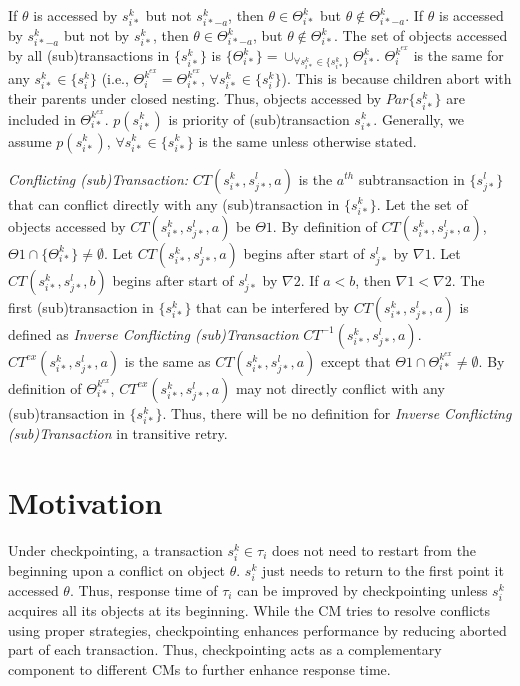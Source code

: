 \documentclass[preprint]{sigplanconf}
\begin{document}
If $\theta$ is accessed by $s_{i*}^{k}$ but not $s_{i*-a}^{k}$,
then $\theta\in\Theta_{i*}^{k}$ but $\theta\not\in\Theta_{i*-a}^{k}$.
If $\theta$ is accessed by $s_{i*-a}^{k}$ but not by $s_{i*}^{k}$,
then $\theta\in\Theta_{i*-a}^{k}$, but $\theta\not\in\Theta_{i*}^{k}$.
The set of objects accessed by all (sub)transactions in $\{s_{i*}^{k}\}$
is $\{\Theta_{i*}^{k}\}=\cup_{\forall s_{i*}^{k}\in\{s_{i*}^{k}\}}\Theta_{i*}^{k}$. $\Theta_{i}^{k^{ex}}$
is the same for any $s_{i*}^{k}\in\{s_{i}^{k}\}$ (i.e., $\Theta_{i}^{k^{ex}}=\Theta_{i*}^{k^{ex}},\,\forall s_{i*}^{k}\in\{s_{i}^{k}\}$).
This is because children abort with their parents under closed nesting.
Thus, objects accessed by $Par\{s_{i*}^{k}\}$ are included in $\Theta_{i*}^{k^{ex}}$. $p(s_{i*}^{k})$ is priority of (sub)transaction $s_{i*}^{k}$. Generally,
we assume $p(s_{i*}^{k}),\,\forall s_{i*}^{k}\in\{s_{i*}^{k}\}$ is
the same unless otherwise stated.

\textit{Conflicting (sub)Transaction:} $CT(s_{i*}^{k},s_{j*}^{l},a)$
is the $a^{th}$ subtransaction in $\{s_{j*}^{l}\}$ that can conflict
directly with any (sub)transaction in $\{s_{i*}^{k}\}$. Let the set
of objects accessed by $CT(s_{i*}^{k},s_{j*}^{l},a)$ be $\Theta1$.
By definition of $CT(s_{i*}^{k},s_{j*}^{l},a)$, $\Theta1\cap\{\Theta_{i*}^{k}\}\neq\emptyset$.
Let $CT(s_{i*}^{k},s_{j*}^{l},a)$ begins after start of $s_{j*}^{l}$
by $\nabla1$. Let $CT(s_{i*}^{k},s_{j*}^{l},b)$ begins after start
of $s_{j*}^{l}$ by $\nabla2$. If $a<b$, then $\nabla1<\nabla2$.
The first (sub)transaction in $\{s_{i*}^{k}\}$ that can be interfered
by $CT(s_{i*}^{k},s_{j*}^{l},a)$ is defined as \textit{Inverse Conflicting
(sub)Transaction} $CT^{-1}(s_{i*}^{k},s_{j*}^{l},a)$. $CT^{ex}(s_{i*}^{k},s_{j*}^{l},a)$
is the same as $CT(s_{i*}^{k},s_{j*}^{l},a)$ except that $\Theta1\cap\Theta_{i*}^{k^{ex}}\neq\emptyset$.
By definition of $\Theta_{i*}^{k^{ex}}$, $CT^{ex}(s_{i*}^{k},s_{j*}^{l},a)$
may not directly conflict with any (sub)transaction in $\{s_{i*}^{k}\}$.
Thus, there will be no definition for \textit{Inverse Conflicting
(sub)Transaction} in transitive retry.

\section{Motivation}\label{sec:motivation}

Under checkpointing, a transaction $s_i^k \in \tau_i$ does not need to restart from the beginning upon a conflict on object $\theta$. $s_i^k$ just needs to return to the first point it accessed $\theta$. Thus, response time of $\tau_i$ can be improved by checkpointing unless $s_i^k$ acquires all its objects at its beginning. While the CM tries to resolve conflicts using proper strategies, checkpointing enhances performance by reducing aborted part of each transaction. Thus, checkpointing acts as a complementary component to different CMs to further enhance response time.
\end{document}
